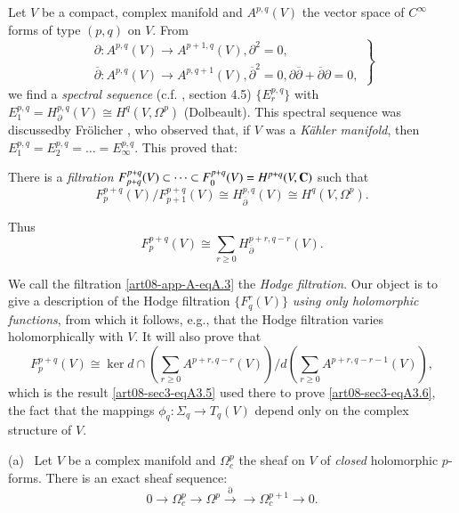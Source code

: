Let $V$ be a compact, complex manifold and $A^{p,q}(V)$ the vector space of $C^{\infty}$ forms of type $(p,q)$ on $V$. From
\setcounter{equation}{0}
\begin{equation}
\left.
\begin{array}{l}
\partial : A^{p,q}(V)\to A^{p+1,q}(V), \partial^{2}=0,\\
\overline{\partial} : A^{p,q}(V)\to A^{p,q+1}(V), \overline{\partial}^{2}=0, \partial\overline{\partial}+\overline{\partial}\partial=0,
\end{array}\right\}\label{art08-app-A-eqA.1}
\end{equation}
we find a {\em spectral sequence} (c.f. \cite{art08-key7}, section 4.5) $\{E^{p,q}_{r}\}$ with $E^{p,q}_{1}=H^{p,q}_{\partial}(V)\cong H^{q}(V,\Omega^{p})$ (Dolbeault). This spectral sequence was discussed\pageoriginale by Fr\"olicher \cite{art08-key6}, who observed that, if $V$ was a {\em K\"ahler manifold}, then $E^{p,q}_{1}=E^{p,q}_{2}=\ldots=E^{p,q}_{\infty}$. This proved that:

There is a {\em filtration} $F^{p+q}_{p+q}(V)\subset\cdots\subset F^{p+q}_{0}(V)=H^{p+q}(V,\mathbf{C})$ such that 
\begin{equation}
F^{p+q}_{p}(V)/F^{p+q}_{p+1}(V)\cong H^{p,q}_{\overline{\partial}}(V)\cong H^{q}(V,\Omega^{p}).\label{art08-app-A-eqA.2}
\end{equation}

Thus
\begin{equation}
F^{p+q}_{p}(V)\cong \sum\limits_{r\geq 0}H^{p+r,q-r}_{\overline{\partial}}(V).\label{art08-app-A-eqA.3}
\end{equation}

We call the filtration \eqref{art08-app-A-eqA.3} the {\em Hodge filtration}. Our object is to give a description of the Hodge filtration $\{F^{r}_{q}(V)\}$ {\em using only holomorphic functions}, from which it follows, e.g., that the Hodge filtration varies holomorphically with $V$. It will also prove that 
\begin{equation}
F^{p+q}_{p}(V)\cong \ker d\cap \left(\sum\limits_{r\geq 0}A^{p+r,q-r}(V)\right)/ d\left(\sum\limits_{r\geq 0}A^{p+r,q-r-1}(V)\right),\label{art08-app-A-eqA.4}
\end{equation}
which is the result \eqref{art08-sec3-eqA3.5} used there to prove \eqref{art08-sec3-eqA3.6}, the fact that the mappings $\phi_{q}:\Sigma_{q}\to T_{q}(V)$ depend only on the complex structure of $V$.

(a)~ Let $V$ be a complex manifold and $\Omega^{p}_{c}$ the sheaf on $V$ of {\em closed} holomorphic $p$-forms. There is an exact sheaf sequence:
\begin{equation}
0\to \Omega^{p}_{c}\to \Omega^{p}\xrightarrow{\partial}\to \Omega^{p+1}_{c}\to 0.\label{art08-app-A-eqA.5}
\end{equation}

